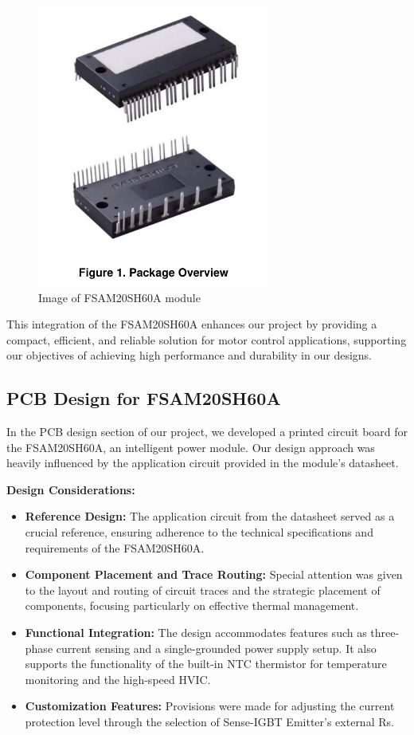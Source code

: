 \begin{figure}[H]
    \centering
    \includegraphics[width=3in]{sections/section4/images/IPM/ipm.png}
    \caption{Image of FSAM20SH60A module}
\end{figure}

This integration of the FSAM20SH60A enhances our project by providing a compact, efficient, and reliable solution for motor control applications, supporting our objectives of achieving high performance and durability in our designs.


\subsection{PCB Design for FSAM20SH60A}

In the PCB design section of our project, we developed a printed circuit board for the FSAM20SH60A, an intelligent power module. Our design approach was heavily influenced by the application circuit provided in the module's datasheet.

\textbf{Design Considerations:}
\begin{itemize}
    \item \textbf{Reference Design:} The application circuit from the datasheet served as a crucial reference, ensuring adherence to the technical specifications and requirements of the FSAM20SH60A.
    \item \textbf{Component Placement and Trace Routing:} Special attention was given to the layout and routing of circuit traces and the strategic placement of components, focusing particularly on effective thermal management.
    \item \textbf{Functional Integration:} The design accommodates features such as three-phase current sensing and a single-grounded power supply setup. It also supports the functionality of the built-in NTC thermistor for temperature monitoring and the high-speed HVIC.
    \item \textbf{Customization Features:} Provisions were made for adjusting the current protection level through the selection of Sense-IGBT Emitter's external Rs.
\end{itemize}

